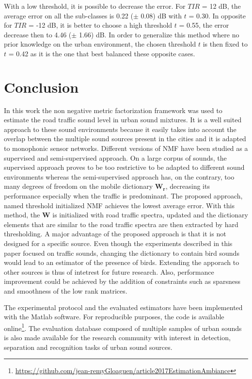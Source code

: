 \documentclass[twocolumn]{svjour3}          %
\begin{document}
With a low threshold, it is possible to decrease the error. For $TIR$ = 12 dB, the average error on all the sub-classes is 0.22 ($\pm$ 0.08) dB with $t$ = 0.30. In opposite for $TIR$ = -12 dB, it is better to choose a high threshold $t$ = 0.55, the error decrease then to 4.46 ($\pm$ 1.66) dB. In order to generalize this method where no prior knowledge on the urban environment, the chosen threshold $t$ is then fixed to $t$ = 0.42 as it is the one that best balanced these opposite cases.

\section{Conclusion}

In this work the non negative metric factorization framework  was used to estimate the road traffic sound level in urban sound mixtures. It is a well suited approach to these sound environments because it easily takes into account the overlap between the multiple sound sources present in the cities and it is adapted to monophonic sensor networks. Different versions of NMF have been studied as a supervised and semi-supervised approach. On a large corpus of sounds, the supervised approach proves to be too restrictive to be adapted to different sound environments whereas the semi-supervised approach has, on the contrary, too many degrees of freedom on the mobile dictionary $\mathbf{W_r}$, decreasing its performance especially when the traffic is predominant. The proposed approach, named threshold initialized NMF achieves the lowest average error. With this method, the $\mathbf{W}$ is initialized with road traffic spectra, updated and the dictionary elements that are similar to the road traffic spectra are then extracted by hard thresholding.
A major advantage of the proposed approach is that it is not designed for a specific source. Even though the experiments described in this paper focused on traffic sounds, changing the dictionary to contain bird sounds would lead to an estimator of the presence of birds. Extending the apporach to other sources is thus of intetrest for future research. Also, performance improvement could be achieved by the addition of constraints such as sparsness \cite{hoyer2004non} and smoothness \cite{virtanen_monaural_2007} of the low rank matrices.

The experimental protocol and the evaluated estimators have been implemented with the Matlab software. For reproducible purposes, the code is available online\footnote{\url{https://github.com/jean-remyGloaguen/article2017EstimationAmbiance}}. The evaluation database composed of multiple samples of urban sounds is also made available for the research community with interest in detection, separation and recognition tasks of urban sound sources.
\end{document}
